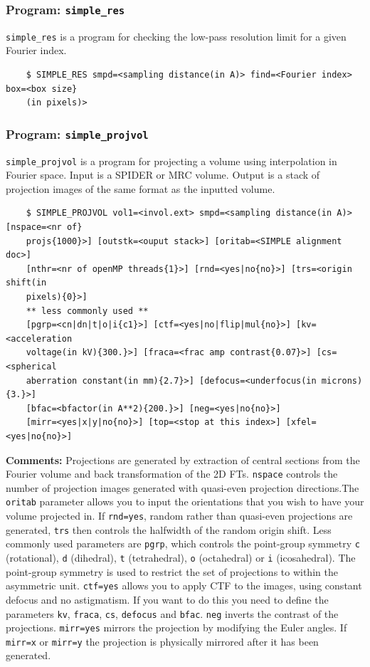 \documentclass[a4paper,11pt]{article}
\newcommand{\prgname}[1]{\textcolor{NavyBlue}{\texttt{#1}}}
\begin{document}
\subsubsection{Program: \prgname{simple\_res}}
\label{res}
\prgname{simple\_res} is a program for checking the low-pass resolution limit for a given Fourier index.
\begin{verbatim}
    $ SIMPLE_RES smpd=<sampling distance(in A)> find=<Fourier index> box=<box size}
    (in pixels)>
\end{verbatim}

\subsubsection{Program: \prgname{simple\_projvol}}
\label{projvol}
\prgname{simple\_projvol} is a program for projecting a volume using interpolation in Fourier space. Input is a SPIDER or MRC volume. Output is a stack of projection images of the same format as the inputted volume.
\begin{verbatim}
    $ SIMPLE_PROJVOL vol1=<invol.ext> smpd=<sampling distance(in A)> [nspace=<nr of}
    projs{1000}>] [outstk=<ouput stack>] [oritab=<SIMPLE alignment doc>]
    [nthr=<nr of openMP threads{1}>] [rnd=<yes|no{no}>] [trs=<origin shift(in
    pixels){0}>]
    ** less commonly used **
    [pgrp=<cn|dn|t|o|i{c1}>] [ctf=<yes|no|flip|mul{no}>] [kv=<acceleration
    voltage(in kV){300.}>] [fraca=<frac amp contrast{0.07}>] [cs=<spherical
    aberration constant(in mm){2.7}>] [defocus=<underfocus(in microns){3.}>]
    [bfac=<bfactor(in A**2){200.}>] [neg=<yes|no{no}>]
    [mirr=<yes|x|y|no{no}>] [top=<stop at this index>] [xfel=<yes|no{no}>]
\end{verbatim}
\noindent\textbf{Comments:} Projections are generated by extraction of central sections from the Fourier volume and back transformation of the 2D FTs. \texttt{nspace} controls the number of projection images generated with quasi-even projection directions.The \texttt{oritab} parameter allows you to input the orientations that you wish to have your volume projected in. If \texttt{rnd=yes}, random rather than quasi-even projections are generated, \texttt{trs} then controls the halfwidth of the random origin shift. Less commonly used parameters are \texttt{pgrp}, which controls the point-group symmetry \texttt{c} (rotational), \texttt{d} (dihedral), \texttt{t} (tetrahedral), \texttt{o} (octahedral) or \texttt{i} (icosahedral). The point-group symmetry is used to restrict the set of projections to within the asymmetric unit. \texttt{ctf=yes} allows you to apply CTF to the images, using constant defocus and no astigmatism. If you want to do this you need to define the parameters \texttt{kv}, \texttt{fraca}, \texttt{cs}, \texttt{defocus} and \texttt{bfac}. \texttt{neg} inverts the contrast of the projections. \texttt{mirr=yes} mirrors the projection by modifying the Euler angles. If \texttt{mirr=x} or \texttt{mirr=y} the projection is physically mirrored after it has been generated.
\end{document}
